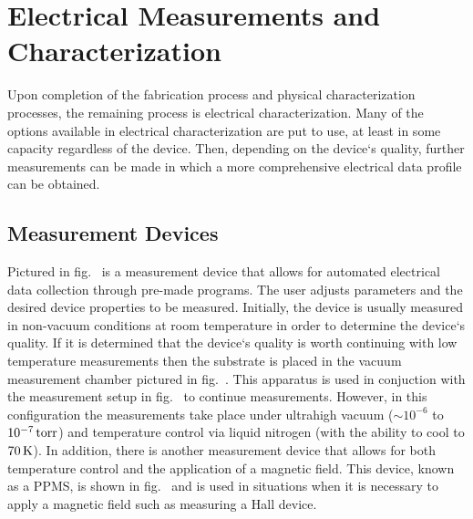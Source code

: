\section{Electrical Measurements and Characterization}\label{sec:measurements}
Upon completion of the fabrication process and physical characterization processes, the remaining process is electrical characterization. Many of the options available in electrical characterization are put to use, at least in some capacity regardless of the device. Then, depending on the device`s quality, further measurements can be made in which a more comprehensive electrical data profile can be obtained.
\subsection{Measurement Devices}\label{subsec:measurement_devices}
Pictured in fig.~ is a measurement device that allows for automated electrical data collection through pre-made programs. The user adjusts parameters and the desired device properties to be measured. Initially, the device is usually measured in non-vacuum conditions at room temperature in order to determine the device`s quality. If it is determined that the device`s quality is worth continuing with low temperature measurements then the substrate is placed in the vacuum measurement chamber pictured in fig.~. This apparatus is used in conjuction with the measurement setup in fig.~ to continue measurements. However, in this configuration the measurements take place under ultrahigh vacuum ($\sim 10^{-6}$ to $10^{-7}\,\mathrm{torr}$) and temperature control via liquid nitrogen (with the ability to cool to $70\,\mathrm{K}$). In addition, there is another measurement device that allows for both temperature control and the application of a magnetic field. This device, known as a \ac{PPMS}, is shown in fig.~ and is used in situations when it is necessary to apply a magnetic field such as measuring a Hall device.
